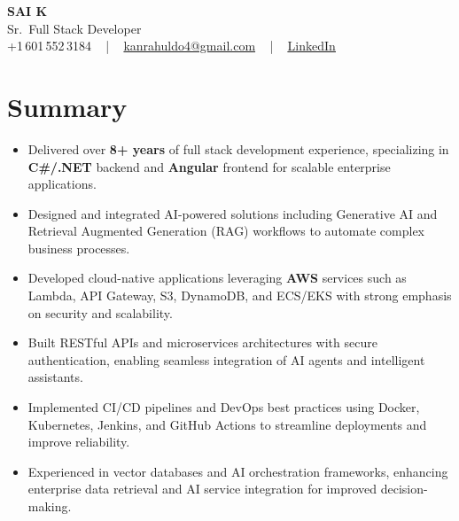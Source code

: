 \documentclass[letterpaper,11pt]{article}
\newcommand{\resumeItem}[1]{
  \item\footnotesize{
    {#1 \vspace{-2pt}}
  }
}
\newcommand{\resumeItemListStart}{\begin{itemize}[leftmargin=*]}
\newcommand{\resumeItemListEnd}{\end{itemize}\vspace{-5pt}}
\begin{document}
\begin{center}
    {\fontsize{14pt}{12pt}\selectfont \textbf{\MakeUppercase{Sai K}}}\\ \vspace{2pt}
    \fontsize{10pt}{12pt}\selectfont Sr.\ Full Stack Developer\\ \vspace{2pt}
    \fontsize{10pt}{12pt}\selectfont +1\,601\,552\,3184 ~ | ~
    \href{mailto:kanrahuldo4@gmail.com}{kanrahuldo4@gmail.com} ~ | ~
    \href{https://www.linkedin.com/in/srrrk/}{\color{blue}\underline{LinkedIn}}
    \vspace{-10pt}
\end{center}

\section{Summary}
\fontsize{9pt}{10pt}\selectfont
\resumeItemListStart
  \resumeItem{Delivered over \textbf{8+ years} of full stack development experience, specializing in \textbf{C\#/.NET} backend and \textbf{Angular} frontend for scalable enterprise applications.}
  \resumeItem{Designed and integrated AI-powered solutions including Generative AI and Retrieval Augmented Generation (RAG) workflows to automate complex business processes.}
  \resumeItem{Developed cloud-native applications leveraging \textbf{AWS} services such as Lambda, API Gateway, S3, DynamoDB, and ECS/EKS with strong emphasis on security and scalability.}
  \resumeItem{Built RESTful APIs and microservices architectures with secure authentication, enabling seamless integration of AI agents and intelligent assistants.}
  \resumeItem{Implemented CI/CD pipelines and DevOps best practices using Docker, Kubernetes, Jenkins, and GitHub Actions to streamline deployments and improve reliability.}
  \resumeItem{Experienced in vector databases and AI orchestration frameworks, enhancing enterprise data retrieval and AI service integration for improved decision-making.}
\resumeItemListEnd
\vspace{-6pt}

\end{document}
